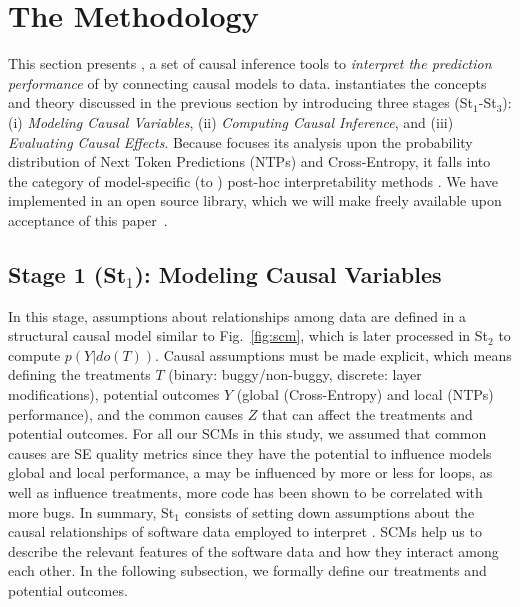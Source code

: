 \section{The \codegen Methodology }
\label{sec:appII-approach}

This section presents \codegen, a set of causal inference tools to \textit{interpret the prediction performance} of \nlms by connecting causal models to data. \codegen instantiates the concepts and theory discussed in the previous section by introducing three stages (St$_1$-St$_3$): (i) \textit{Modeling Causal Variables}, (ii) \textit{Computing Causal Inference}, and (iii) \textit{Evaluating Causal Effects}. Because \codegen focuses its analysis upon the probability distribution of Next Token Predictions (NTPs) and Cross-Entropy, it falls into the category of model-specific (\ie to \nlms) post-hoc interpretability methods \citep{molnar2019interpret}. We have implemented \codegen in an open source library, which we will make freely available upon acceptance of this paper~\citep{icodegen}.

\subsection{Stage 1 (St$_1$): Modeling Causal Variables}
In this stage, assumptions about relationships among data are defined in a structural causal model similar to Fig.~\ref{fig:scm}, which is later processed in St$_2$ to compute $p(Y|do(T))$. Causal assumptions must be made explicit, which means defining the treatments $T$ (\ie binary: buggy/non-buggy, discrete: layer modifications), potential outcomes $Y$ (\ie global (Cross-Entropy) and local (NTPs) performance), and the common causes $Z$ that can affect the treatments and potential outcomes. For all our SCMs in this study, we assumed that common causes are SE quality metrics since they have the potential to influence models global and local performance, \ie a \nlm may be influenced by more or less for loops, as well as influence treatments, \ie more code has been shown to be correlated with more bugs. In summary, St$_1$ consists of setting down assumptions about the causal relationships of software data employed to interpret \nlms. SCMs help us to describe the relevant features of the software data and how they interact among each other. In the following subsection, we formally define our treatments and potential outcomes.  

